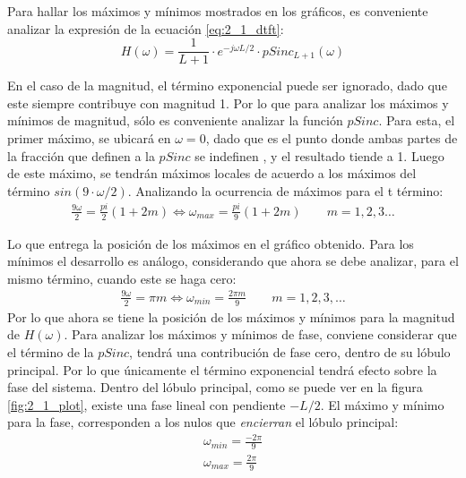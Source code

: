		Para hallar los máximos y mínimos mostrados en los gráficos, es conveniente analizar la expresión de la ecuación \ref{eq:2_1_dtft}:
		\begin{equation*}
			H(\omega) = \frac{1}{L+1} \cdot e^{-j \omega L /2} \cdot pSinc_{L+1}(\omega)
		\end{equation*}	
		
		En el caso de la magnitud, el término exponencial puede ser ignorado, dado que este siempre contribuye con magnitud 1. Por lo que para analizar los máximos y mínimos de magnitud, sólo es conveniente analizar la función $pSinc$. Para esta, el primer máximo, se ubicará en $\omega = 0$, dado que es el punto donde ambas partes de la fracción que definen a la $pSinc$ se indefinen , y el resultado tiende a 1. Luego de este máximo, se tendrán máximos locales de acuerdo a los máximos del término $sin(9 \cdot \omega /2)$. Analizando la ocurrencia de máximos para el t término:
		\begin{gather*}
			\frac{9 \omega}{2} = \frac{pi}{2} \left( 1 + 2m \right) \Longleftrightarrow \omega_{max} = \frac{pi}{9} \left( 1 + 2m \right) \qquad m = 1,2,3 \dots
		\end{gather*}
		
		Lo que entrega la posición de los máximos en el gráfico obtenido. Para los mínimos el desarrollo es análogo, considerando que ahora se debe analizar, para el mismo término, cuando este se haga cero:
		\begin{gather*}
			\frac{9 \omega}{2} = \pi m \Longleftrightarrow \omega_{min} = \frac{2\pi m}{9} \qquad m = 1,2,3,\dots
		\end{gather*}		
		Por lo que ahora se tiene la posición de los máximos y mínimos para la magnitud de $H(\omega)$. Para analizar los máximos y mínimos de fase, conviene considerar que el término de la $pSinc$, tendrá una contribución de fase cero, dentro de su lóbulo principal. Por lo que únicamente el término exponencial tendrá efecto sobre la fase del sistema. Dentro del lóbulo principal, como se puede ver en la figura \ref{fig:2_1_plot}, existe una fase lineal con pendiente $-L/2$. El máximo y mínimo para la fase, corresponden a los nulos que \textit{encierran} el lóbulo principal:
		\begin{align*}
			\omega_{min} = \frac{-2\pi}{9} \\
			\omega_{max} = \frac{2\pi}{9}
		\end{align*}
		
	\subsection{} %
	
